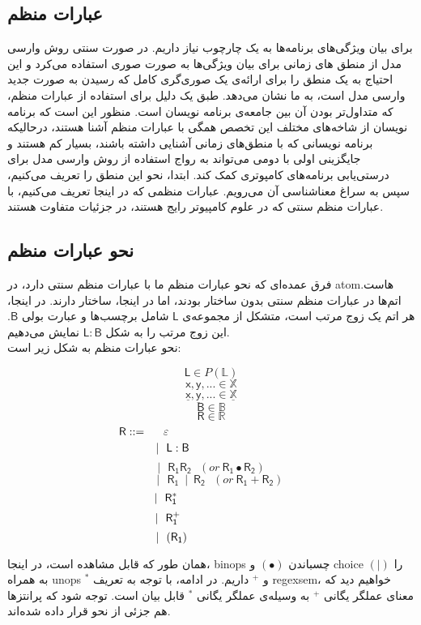 \subsection{عبارات منظم}
برای بیان ویژگی‌های برنامه‌ها به یک چارچوب نیاز داریم. در صورت سنتی روش وارسی مدل از منطق های زمانی برای بیان ویژگی‌ها به صورت صوری استفاده می‌کرد و این احتیاج به یک منطق را برای ارائه‌ی یک صوری‌گری کامل که رسیدن به صورت جدید وارسی مدل است، به ما نشان می‌دهد. طبق \cite{calcul} یک دلیل برای استفاده از عبارات منظم، که متداول‌تر بودن آن بین جامعه‌ی برنامه نویسان است. منظور این است که برنامه نویسان از شاخه‌های مختلف این تخصص همگی با عبارات منظم آشنا هستند، درحالیکه برنامه نویسانی که با منطق‌های زمانی آشنایی داشته باشند، بسیار کم هستند و جایگزینی اولی با دومی می‌تواند به رواج استفاده از روش وارسی مدل برای درستی‌یابی برنامه‌های کامپوتری کمک کند. ابتدا، نحو این منطق را تعریف می‌کنیم، سپس به سراغ معناشناسی آن می‌رویم. عبارات منظمی که در اینجا تعریف می‌کنیم، با عبارات منظم سنتی که در علوم کامپیوتر رایج هستند، در جزئیات متفاوت هستند. 
\subsection{نحو عبارات منظم}
فرق عمده‌ای که نحو عبارات منظم ما با عبارات منظم سنتی دارد، در \gls{atom}هاست. اتم‌ها در عبارات منظم سنتی بدون ساختار بودند، اما در اینجا، ساختار دارند. در اینجا، هر اتم یک زوج مرتب است، متشکل از مجموعه‌ی $\mathsf{L}$ شامل برچسب‌ها و عبارت بولی $\mathsf{B}$. این زوج مرتب را به شکل 
$\mathsf{L : B}$
نمایش می‌دهیم.\\ 
نحو عبارات منظم به شکل زیر است:
\begin{defn}
$$\mathsf{L} \in \mathit{P}(\mathbb{L})$$        
$$\mathsf{x,y,...} \in \mathbb{X}$$
$$\mathsf{\underline{x},\underline{y},...} \in \mathbb{\underline{X}}$$
$$\mathsf{B} \in \mathbb{B}$$
$$\mathsf{R} \in \mathbb{R}$$
$$\mathsf{R} ::=\hspace{0.5cm} \varepsilon\hspace{4.2cm}$$
$$|\:\:\:\mathsf{L : B}\hspace{2.4cm}$$
$$|\:\:\:\mathsf{R_1 R_2}\:\:\:(or\:\mathsf{R_1 \bullet R_2 })$$
$$\:\:\:\:\:\:\:|\:\:\:\mathsf{R_1\:\mid\:R_2}\:\:\:(or\:\mathsf{R_1 + R_2 })$$
$$|\:\:\:\mathsf{R_1^*}\hspace{2.8cm}$$
$$|\:\:\:\mathsf{R_1^+}\hspace{2.7cm}$$
$$|\:\:\:(\mathsf{R_1})\hspace{2.47cm}$$
\end{defn}
همان طور که قابل مشاهده است، در اینجا، \glspl*{binop} چسباندن
$(\bullet)$
 و \gls{choice}
$(|)$
 را به همراه \glspl*{unop}
$^*$
و
$^+$
داریم.
در ادامه، با توجه به تعریف \gls{regexsem}، خواهیم دید که معنای عملگر یگانی 
$^+$
به وسیله‌ی عملگر یگانی $^*$ قابل بیان است.
توجه شود که پرانتزها هم جزئی از نحو قرار داده شده‌اند.


